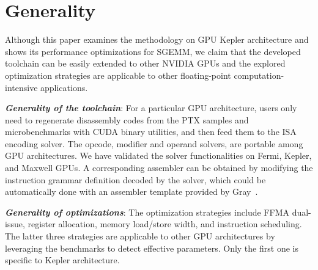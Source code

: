 \section{Generality}
\label{sec:generality}

Although this paper examines the methodology on GPU Kepler architecture and shows its performance optimizations for SGEMM, we claim that the developed toolchain can be easily extended to other NVIDIA GPUs and the explored optimization strategies are applicable to other floating-point computation-intensive applications.

{\em {\bf Generality of the toolchain}}: For a particular GPU architecture, users only need to regenerate disassembly codes from the PTX samples and microbenchmarks with CUDA binary utilities, and then feed them to the ISA encoding solver.
The opcode, modifier and operand solvers, are portable among GPU architectures. 
We have validated the solver functionalities on Fermi, Kepler, and Maxwell GPUs. 
A corresponding assembler can be obtained by modifying the instruction grammar definition decoded by the solver, which could be automatically done with an assembler template provided by Gray~\cite{baldassin2005extending}.

{\em {\bf Generality of optimizations}}: The optimization strategies include
FFMA dual-issue, register allocation, memory load/store width, and instruction
scheduling. The latter three strategies are applicable to other GPU
architectures by leveraging the benchmarks to detect effective parameters. 
Only the first one is specific to Kepler architecture. 


